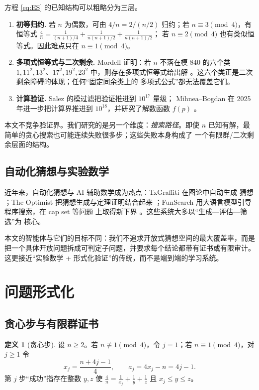 \documentclass[11pt,a4paper]{ctexart}
\theoremstyle{definition}
\newtheorem{definition}[theorem]{定义}
\theoremstyle{remark}
\begin{document}
方程 \eqref{eq:ES} 的已知结构可以粗略分为三层。
\begin{enumerate}
\item \textbf{初等归约.} 若 $n$ 为偶数，可由 $4/n=2/(n/2)$ 归约；若
$n\equiv3\pmod4$，有恒等式
$\frac4n=\frac{1}{(n+1)/4}+\frac{1}{n(n+1)/2}+\frac{1}{n(n+1)/2}$；
若 $n\equiv2\pmod4$ 也有类似恒等式。因此难点只在 $n\equiv1\pmod4$。
\item \textbf{多项式恒等式与二次剩余.} Mordell 证明：若 $n$ 不落在模 $840$
的六个类 $1,11^2,13^2$、$17^2,19^2,23^2$ 中，则存在多项式恒等式给出解
\cite{mordell1967}。这六个类正是二次剩余障碍的体现；任何“固定同余类上的
多项式公式”都无法覆盖它们。
\item \textbf{计算验证.} Salez 的模过滤把验证推进到 $10^{17}$ 量级；
Mihnea--Bogdan 在 2025 年进一步把计算界推进到 $10^{18}$，并研究了解数函数
$f(p)$ \cite{salez2014,mihnea2025}。
\end{enumerate}

本文不竞争验证界。我们研究的是另一个维度：\emph{搜索路径}。即使
$n$ 已知有解，最简单的贪心搜索也可能连续失败很多步；这些失败本身构成了
一个有限群/二次剩余层面的结构。

\subsection{自动化猜想与实验数学}

近年来，自动化猜想与 AI 辅助数学成为热点：TxGraffiti 在图论中自动生成
猜想 \cite{davila2024}；The Optimist 把猜想生成与定理证明结合起来
\cite{optimist2024}；FunSearch 用大语言模型引导程序搜索，在 cap set 等问题
上取得新下界 \cite{funsearch2024}。这些系统大多以“生成—评估—筛选”为
核心。

本文的智能体与它们的目标不同：我们不追求开放式猜想空间的最大覆盖率，而是
把一个具体开放问题拆成可判定子问题，并要求每个结论都带有证书或有限审计。
这更接近“实验数学 + 形式化验证”的传统，而不是端到端的学习系统。

\section{问题形式化}

\subsection{贪心步与有限群证书}

\begin{definition}[贪心步]
设 $n\ge2$。若 $n\not\equiv1\pmod4$，令 $j=1$；若 $n\equiv1\pmod4$，对
$j\ge1$ 令
\[
x_j=\frac{n+4j-1}{4},\qquad a_j=4x_j-n=4j-1 .
\]
第 $j$ 步“成功”指存在整数 $y,z$ 使
$\frac4n=\frac1{x_j}+\frac1y+\frac1z$ 且 $x_j\le y\le z$。
\end{definition}
\end{document}
